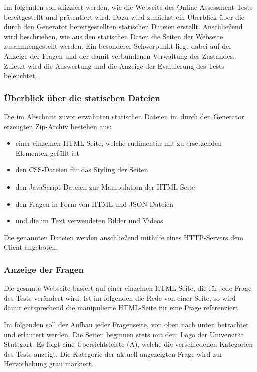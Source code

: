 \label{Jena}

Im folgenden soll skizziert werden, wie die Webseite des Online-Assessment-Tests bereitgestellt und präsentiert wird.
Dazu wird zunächst ein Überblick über die durch den Generator bereitgestellten statischen Dateien erstellt. Anschließend wird beschrieben, wie aus den statischen Daten die Seiten der Webseite zusammengestellt werden.
Ein besonderer Schwerpunkt liegt dabei auf der Anzeige der Fragen und der damit verbundenen Verwaltung des Zustandes.
Zuletzt wird die Auswertung und die Anzeige der Evaluierung des Tests beleuchtet.

\subsubsection{Überblick über die statischen Dateien}

Die im Abschnitt zuvor erwähnten statischen Dateien im durch den Generator erzeugten Zip-Archiv bestehen aus:

\begin{itemize}
\item einer einzelnen HTML-Seite, welche rudimentär mit zu ersetzenden Elementen gefüllt ist

\item den CSS-Dateien für das Styling der Seiten

\item den JavaScript-Dateien zur Manipulation der HTML-Seite 

\item den Fragen in Form von HTML und JSON-Dateien

\item und die im Text verwendeten Bilder und Videos
\end{itemize}

Die genannten Dateien werden anschließend mithilfe eines HTTP-Servers dem Client angeboten. 

\subsubsection{Anzeige der Fragen}

Die gesamte Webseite basiert auf einer einzelnen HTML-Seite, die für jede Frage des Tests verändert wird.
Ist im folgenden die Rede von einer Seite, so wird damit entsprechend die manipulierte HTML-Seite für eine Frage referenziert.

Im folgenden soll der Aufbau jeder Fragenseite, von oben nach unten betrachtet und erläutert werden. 
Die Seiten beginnen stets mit dem Logo der Universität Stuttgart. 
Es folgt eine Übersichtsleiste (A), welche die verschiedenen Kategorien des Tests anzeigt. 
Die Kategorie der aktuell angezeigten Frage wird zur Hervorhebung grau markiert. 

